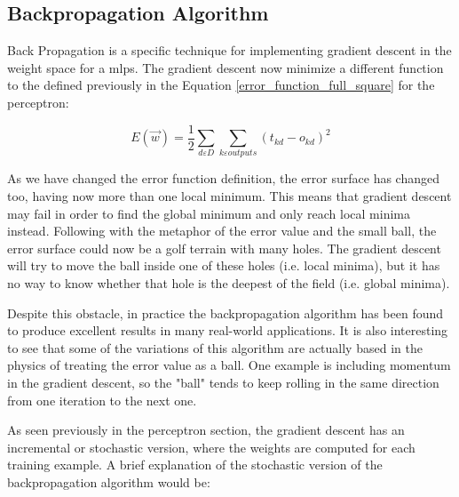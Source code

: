 	\subsection{Backpropagation Algorithm}
	Back Propagation is a specific technique for implementing gradient descent in the weight space for a \glspl{mlp}. The gradient descent now minimize a different function to the defined previously in the Equation \ref{error_function_full_square} for the perceptron: 

		\begin{equation}
			\label{squared_error_function_network}
			E(\vec{w}) = \frac{1}{2} \sum_{d \varepsilon D} \sum_{k \varepsilon outputs} (t_{kd}-o_{kd})^2 
		\end{equation}

	As we have changed the error function definition, the error surface has changed too, having now more than one local minimum. This means that gradient descent may fail in order to find the global minimum and only reach local minima instead. Following with the metaphor of the error value and the small ball, the error surface could now be a golf terrain with many holes. The gradient descent will try to move the ball inside one of these holes (i.e. local minima), but it has no way to know whether that hole is the deepest of the field (i.e. global minima). 

	Despite this obstacle, in practice the backpropagation algorithm has been found to produce excellent results in many real-world applications. It is also interesting to see that some of the variations of this algorithm are actually based in the physics of treating the error value as a ball. One example is including momentum in the gradient descent, so the "ball" tends to keep rolling in the same direction from one iteration to the next one.

	As seen previously in the perceptron section, the gradient descent has an incremental or stochastic version, where the weights are computed for each training example. A brief explanation of the stochastic version of the backpropagation algorithm would be:

